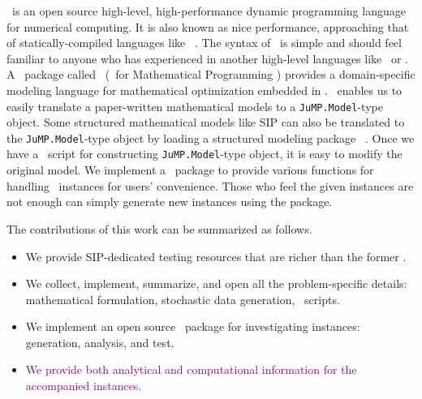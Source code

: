 \julia\ is an open source high-level, high-performance dynamic programming language for numerical computing. It is also known as nice performance, approaching that of statically-compiled languages like \clang\ \cite{journal:BEKS2017}. The syntax of \julia\ is simple and should feel familiar to anyone who has experienced in another high-level languages like \matlab\ or \python. A \julia\ package called \jump\ (\julia\ for Mathematical Programming \cite{web:JuMP}) provides a domain-specific modeling language for mathematical optimization embedded in \julia. \jump\ enables us to easily translate a paper-written mathematical models to a \texttt{JuMP.Model}-type object. Some structured mathematical models like SIP can also be translated to the \texttt{JuMP.Model}-type object by loading a structured modeling package \structjump\ \cite{web:StructJuMP}. Once we have a \julia\ script for constructing \texttt{JuMP.Model}-type object, it is easy to modify the original model. %
We implement a \julia\ package to provide various functions for handling \siplibtwo\ instances for users' convenience. Those who feel the given instances are not enough can simply generate new instances using the package.


The contributions of this work can be summarized as follows.
\begin{itemize}
	\item We provide SIP-dedicated testing resources that are richer than the former \siplib.
	\item We collect, implement, summarize, and open all the problem-specific details: mathematical formulation, stochastic data generation, \julia\ scripts.
	\item We implement an open source \julia\ package for investigating instances: generation, analysis, and test.
	\item \textcolor{purple}{We provide both analytical and computational information for the accompanied instances.}
\end{itemize}


